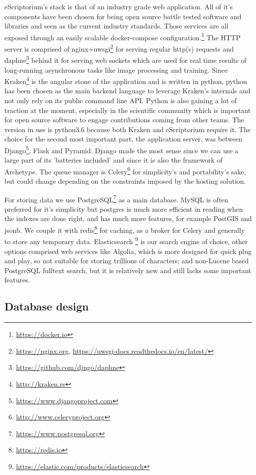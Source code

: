 eScriptorium’s stack is that of an industry grade web application. All of it’s
components have been chosen for being open source battle tested software and
libraries and seen as the current industry standards. Those services are all
exposed through an easily scalable docker-compose
configuration.\footnote{\url{https://docker.io}} The HTTP server is comprised
of nginx+uwsgi\footnote{\url{https://nginx.org},
\url{https://uwsgi-docs.readthedocs.io/en/latest/}} for serving regular http(s)
requests and daphne\footnote{\url{https://github.com/djngo/daphne}} behind it
for serving web sockets which are used for real time results of long-running
asynchronous tasks like image processing and training.  Since
Kraken\footnote{\url{http://kraken.re}} is the angular stone of the application
and is written in python, python has been chosen as the main backend language
to leverage Kraken’s internals and not only rely on its public command line
API. Python is also gaining a lot of traction at the moment, especially in the
scientific community which is important for open source software to
engage contributions coming from other teams. The version
in use is python3.6 because both Kraken and eScriptorium
require it. The choice for the second most important part, the application
server, was between Django\footnote{\url{https://www.djangoproject.com}}, Flask
and Pyramid.  Django made the most sense since we can use a large part of its
’batteries included’ and since it is also the framework of Archetype. The queue
manager is Celery\footnote{\url{http://www.celeryproject.org}} for simplicity’s
and portability’s sake, but could change depending on the constraints imposed by the hosting solution.

For storing data we use PostgreSQL\footnote{\url{https://www.postgresql.org}}
as a main database.  MySQL is often preferred for it’s simplicity but postgres
is much more efficient in reading when the indexes are done right, and has much
more features, for example PostGIS and jsonb. We couple it with
redis\footnote{\url{https://redis.io}} for caching, as a broker for Celery and
generally to store any temporary data. Elasticsearch
\footnote{\url{https://elastic.com/products/elasticsearch}} is our search
engine of choice, other options comprised web services like Algolia, which is
more designed for quick plug and play, so not suitable for storing trillions of
characters; and non-Lucene based PostgreSQL fulltext search, but it is
relatively new and still lacks some important features.

\subsection{Database design}


